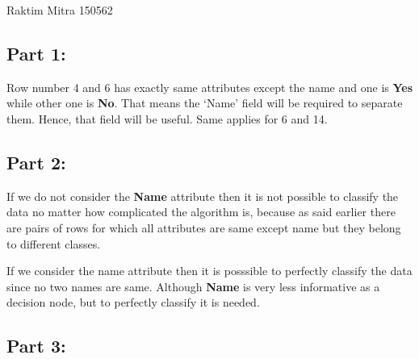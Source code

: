 \documentclass[a4paper,11pt]{article}
\begin{document}
								{Raktim Mitra}      						           		%
								{150562}																		%

\begin{mlsolution}


\subsection*{Part 1:} Row number 4 and 6 has exactly same attributes except the name and one is \textbf{Yes} while other one is \textbf{No}. That means the `Name' field will be required to separate them. Hence, that field will be useful. Same applies for 6 and 14.
\subsection*{Part 2:}
If we do not consider the \textbf{Name} attribute then it is not possible to classify the data no matter how complicated the algorithm is, because as said earlier there are pairs of rows for which all attributes are same except name but they belong to different classes.


If we consider the name attribute then it is posssible to perfectly classify the  data since no two names are same. Although \textbf{Name } is very less informative as a decision node, but to perfectly classify it is needed. 

\subsection*{Part 3:}


\end{mlsolution}
\end{document}
